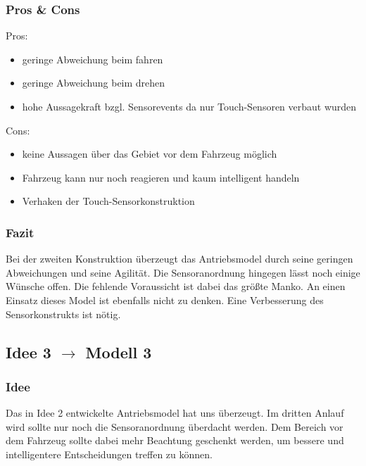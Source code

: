 \documentclass[10pt,a4paper]{scrartcl}
\begin{document}
\subsubsection{Pros \& Cons}
Pros:
\begin{itemize}
\item geringe Abweichung beim fahren
\item geringe Abweichung beim drehen
\item hohe Aussagekraft bzgl. Sensorevents da nur Touch-Sensoren verbaut wurden
\end{itemize}
Cons:
\begin{itemize}
\item keine Aussagen über das Gebiet vor dem Fahrzeug möglich
\item Fahrzeug kann nur noch reagieren und kaum intelligent handeln
\item Verhaken der Touch-Sensorkonstruktion
\end{itemize}
\subsubsection{Fazit}
Bei der zweiten Konstruktion überzeugt das Antriebsmodel durch seine geringen Abweichungen und seine Agilität. Die Sensoranordnung hingegen lässt noch einige Wünsche offen. Die fehlende Voraussicht ist dabei das größte Manko. An einen Einsatz dieses Model ist ebenfalls nicht zu denken. Eine Verbesserung des Sensorkonstrukts ist nötig.
\subsection{Idee 3 $\rightarrow$ Modell 3}%
\subsubsection{Idee}
Das in Idee 2 entwickelte Antriebsmodel hat uns überzeugt. Im dritten Anlauf wird sollte nur noch die Sensoranordnung überdacht werden. Dem Bereich vor dem Fahrzeug sollte dabei mehr Beachtung geschenkt werden, um bessere und intelligentere Entscheidungen treffen zu können.
\end{document}
